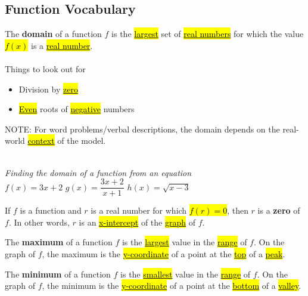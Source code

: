 \subsection{Function Vocabulary}
\begin{definition}[domain]
 The \textbf{domain} of a function $f$ is the \underline{\hl{largest}} set of \underline{\hl{real numbers}} for which the value \underline{\hl{$f(x)$}} is a \underline{\hl{real number}}.\\ \\
Things to look out for
\begin{itemize}
    \item Division by \underline{\hl{zero}}
    \item \underline{\hl{Even}} roots of \underline{\hl{negative}} numbers
\end{itemize}
 NOTE: For word problems/verbal descriptions, the domain depends on the real-world \underline{\hl{context}} of the model.\\ \\
\end{definition}
  \begin{example}
     \textit{Finding the domain of a function from an equation}\\
     \vspace*{12 pt}
         $f(x)=3x+2$ \hspace{\hfill} $g(x)=\dfrac{3x+2}{x+1}$ \hspace{\hfill} $h(x)=\sqrt{x-3}$
 \end{example}
 
 
\begin{definition}[zero]
 If $f$ is a function and $r$ is a real number for which \underline{\hl{$f(r)=0$}}, then $r$ is a \textbf{zero} of $f$. In other words, $r$ is an \underline{\hl{x-intercept}} of the \underline{\hl{graph}} of $f$.
\end{definition}
\begin{definition}[maximum]
 The \textbf{maximum} of a function $f$ is the \underline{\hl{largest}} value in the \underline{\hl{range}} of $f$. On the graph of $f$, the maximum is the \underline{\hl{y-coordinate}} of a point at the \underline{\hl{top}} of a \underline{\hl{peak}}.
\end{definition}
\begin{definition}[minimum]
 The \textbf{minimum} of a function $f$ is the \underline{\hl{smallest}} value in the \underline{\hl{range}} of $f$. On the graph of $f$, the minimum is the \underline{\hl{y-coordinate}} of a point at the \underline{\hl{bottom}} of a \underline{\hl{valley}}.
\end{definition}

